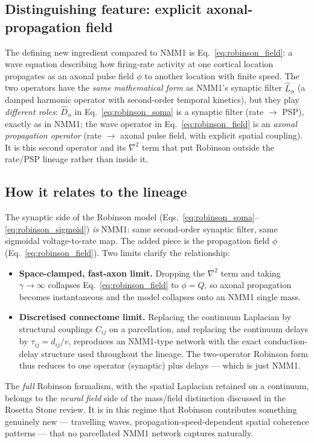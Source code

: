 \documentclass[11pt,a4paper]{article}
\begin{document}
\subsection{Distinguishing feature: explicit axonal-propagation field}

The defining new ingredient compared to NMM1 is Eq.~\eqref{eq:robinson_field}: a wave equation describing how firing-rate activity at one cortical location propagates as an axonal pulse field $\phi$ to another location with finite speed. The two operators have the \emph{same mathematical form} as NMM1's synaptic filter $\hat L_\alpha$ (a damped harmonic operator with second-order temporal kinetics), but they play \emph{different roles}: $\hat D_\alpha$ in Eq.~\eqref{eq:robinson_soma} is a synaptic filter (rate $\to$ PSP), exactly as in NMM1; the wave operator in Eq.~\eqref{eq:robinson_field} is an \emph{axonal propagation operator} (rate $\to$ axonal pulse field, with explicit spatial coupling). It is this second operator and its $\nabla^2$ term that put Robinson outside the rate/PSP lineage rather than inside it.

\subsection{How it relates to the lineage}

The synaptic side of the Robinson model (Eqs.~\eqref{eq:robinson_soma}--\eqref{eq:robinson_sigmoid}) \emph{is} NMM1: same second-order synaptic filter, same sigmoidal voltage-to-rate map. The added piece is the propagation field $\phi$ (Eq.~\eqref{eq:robinson_field}). Two limits clarify the relationship:
\begin{itemize}
\item \textbf{Space-clamped, fast-axon limit.} Dropping the $\nabla^2$ term and taking $\gamma\to\infty$ collapses Eq.~\eqref{eq:robinson_field} to $\phi=Q$, so axonal propagation becomes instantaneous and the model collapses onto an NMM1 single mass.
\item \textbf{Discretised connectome limit.} Replacing the continuum Laplacian by structural couplings $C_{ij}$ on a parcellation, and replacing the continuum delays by $\tau_{ij}=d_{ij}/v$, reproduces an NMM1-type network with the exact conduction-delay structure used throughout the lineage. The two-operator Robinson form thus reduces to one operator (synaptic) plus delays --- which is just NMM1.
\end{itemize}
The \emph{full} Robinson formalism, with the spatial Laplacian retained on a continuum, belongs to the \emph{neural field} side of the mass/field distinction discussed in the Rosetta Stone review. It is in this regime that Robinson contributes something genuinely new --- travelling waves, propagation-speed-dependent spatial coherence patterns --- that no parcellated NMM1 network captures naturally.
\end{document}
